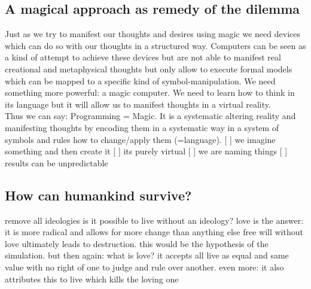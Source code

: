 \subsection{A magical approach as remedy of the dilemma}
Just as we try to manifest our thoughts and desires using magic we need devices which can do so with our thoughts in a structured way. Computers can be seen as a kind of attempt to achieve these devices but are not able to manifest real creational and metaphysical thoughts but only allow to execute formal models which can be mapped to a specific kind of symbol-manipulation. We need something more powerful: a magic computer. We need to learn how to think in its language but it will allow us to manifest thoughts in a virtual reality. \\
Thus we can say: Programming = Magic. It is a systematic altering reality and manifesting thoughts by encoding them in a systematic way in a system of symbols and rules how to change/apply them (=language).
[ ] we imagine something and then create it
[ ] its purely virtual
[ ] we are naming things
[ ] results can be unpredictable

\subsection{How can humankind survive?}
remove all ideologies
is it possible to live without an ideology?
love is the answer: it is more radical and allows for more change than anything else
free will without love ultimately leads to destruction. this would be the hypothesis of the simulation. 
but then again: what is love? it accepts all live as equal and same value with no right of one to judge and rule over another. even more: it also attributes this to live which kills the loving one